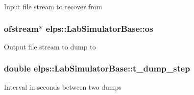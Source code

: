 Input file stream to recover from \hypertarget{classelps_1_1_lab_simulator_base_a799acaededd6716893242514ee55f2be}{
\subsubsection[{os}]{\setlength{\rightskip}{0pt plus 5cm}ofstream$\ast$ elps\+::\+Lab\+Simulator\+Base\+::os\hspace{0.3cm}{\ttfamily [protected]}}}\label{classelps_1_1_lab_simulator_base_a799acaededd6716893242514ee55f2be}
Output file stream to dump to \hypertarget{classelps_1_1_lab_simulator_base_aa259e227b74c8af7336ec106151eb8e6}{
\subsubsection[{t\+\_\+dump\+\_\+step}]{\setlength{\rightskip}{0pt plus 5cm}double elps\+::\+Lab\+Simulator\+Base\+::t\+\_\+dump\+\_\+step\hspace{0.3cm}{\ttfamily [protected]}}}\label{classelps_1_1_lab_simulator_base_aa259e227b74c8af7336ec106151eb8e6}
Interval in seconds between two dumps 